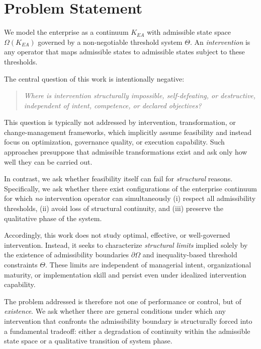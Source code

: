 ﻿\section{Problem Statement}

We model the enterprise as a continuum $K_{EA}$ with admissible state space
$\Omega(K_{EA})$ governed by a non-negotiable threshold system $\Theta$.
An \emph{intervention} is any operator that maps admissible states to admissible
states subject to these thresholds.

The central question of this work is intentionally negative:

\begin{quote}
\emph{Where is intervention structurally impossible, self-defeating, or
destructive, independent of intent, competence, or declared objectives?}
\end{quote}

This question is typically not addressed by intervention, transformation, or
change-management frameworks, which implicitly assume feasibility and instead
focus on optimization, governance quality, or execution capability.
Such approaches presuppose that admissible transformations exist and ask only
how well they can be carried out.

In contrast, we ask whether feasibility itself can fail for \emph{structural}
reasons.
Specifically, we ask whether there exist configurations of the enterprise
continuum for which \emph{no} intervention operator can simultaneously
(i) respect all admissibility thresholds, (ii) avoid loss of structural
continuity, and (iii) preserve the qualitative phase of the system.

Accordingly, this work does not study optimal, effective, or well-governed
intervention.
Instead, it seeks to characterize \emph{structural limits} implied solely by the
existence of admissibility boundaries $\partial\Omega$ and inequality-based
threshold constraints $\Theta$.
These limits are independent of managerial intent, organizational maturity, or
implementation skill and persist even under idealized intervention capability.

The problem addressed is therefore not one of performance or control, but of
\emph{existence}.
We ask whether there are general conditions under which any intervention that
confronts the admissibility boundary is structurally forced into a fundamental
tradeoff: either a degradation of continuity within the admissible state space
or a qualitative transition of system phase.
